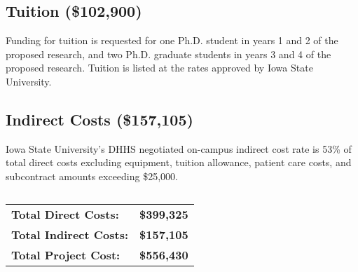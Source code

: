 \documentclass[12pt,letterpaper]{article}
\begin{document}
	
	\subsection*{Tuition (\$102,900)}
	Funding for tuition is requested for one Ph.D. student in years 1 and 2 of the proposed research, and two Ph.D. graduate students in years 3 and 4 of the proposed research.  Tuition is listed at the rates approved by Iowa State University.
	
	\subsection*{Indirect Costs (\$157,105)}
	Iowa State University's DHHS negotiated on-campus indirect cost rate is 53\% of total direct costs excluding equipment, tuition allowance, patient care costs, and subcontract amounts exceeding \$25,000.
	
	\subsection*{}
	
	\begin{tabular}{ll}
			{\large \bf Total Direct Costs:} & {\large \bf \$399,325 }\\
			{\large \bf Total Indirect Costs:} & {\large \bf \$157,105}\\
			{\large \bf Total Project Cost:} & {\large \bf \$556,430}
	\end{tabular}
	
\end{document}
